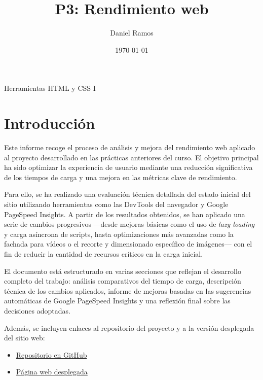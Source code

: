 \documentclass{article}
\title{P3: Rendimiento web}
\author{Daniel Ramos}
\date{\today}
\begin{document}
\maketitle

\begin{center}
    \large Herramientas HTML y CSS I
\end{center}

\newpage

\tableofcontents

\newpage

\section*{Introducción}

Este informe recoge el proceso de análisis y mejora del rendimiento web aplicado al proyecto desarrollado en las prácticas anteriores del curso. El objetivo principal ha sido optimizar la experiencia de usuario mediante una reducción significativa de los tiempos de carga y una mejora en las métricas clave de rendimiento.

Para ello, se ha realizado una evaluación técnica detallada del estado inicial del sitio utilizando herramientas como las DevTools del navegador y Google PageSpeed Insights. A partir de los resultados obtenidos, se han aplicado una serie de cambios progresivos —desde mejoras básicas como el uso de \textit{lazy loading} y carga asíncrona de scripts, hasta optimizaciones más avanzadas como la fachada para vídeos o el recorte y dimensionado específico de imágenes— con el fin de reducir la cantidad de recursos críticos en la carga inicial.

El documento está estructurado en varias secciones que reflejan el desarrollo completo del trabajo: análisis comparativos del tiempo de carga, descripción técnica de los cambios aplicados, informe de mejoras basadas en las sugerencias automáticas de Google PageSpeed Insights y una reflexión final sobre las decisiones adoptadas.

Además, se incluyen enlaces al repositorio del proyecto y a la versión desplegada del sitio web:

\begin{itemize}
    \item \href{https://github.com/DanielRamosAcosta/hhyc-dramosac}{Repositorio en GitHub}
    \item \href{https://www.danielramos.me/hhyc-dramosac}{Página web desplegada}
\end{itemize}
\end{document}
